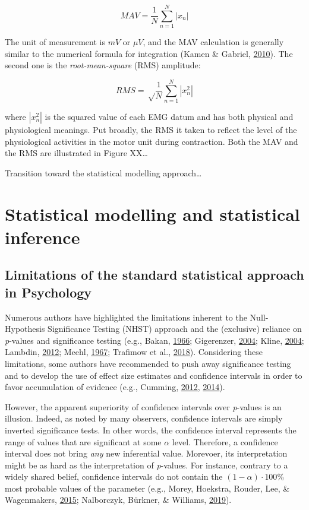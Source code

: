 \documentclass[a4paper,12pt,twoside,openright,oldfontcommands]{memoir}
\begin{document}
\[MAV = \frac{1}{N} \sum_{n=1}^{N} | x_{n} |\]

The unit of measurement is \(mV\) or \(\mu V\), and the MAV calculation
is generally similar to the numerical formula for integration (Kamen \&
Gabriel, \protect\hyperlink{ref-kamen_essentials_2010}{2010}). The
second one is the \emph{root-mean-square} (RMS) amplitude:

\[RMS = \sqrt \frac{1}{N} \sum_{n=1}^{N} | x^{2}_{n} |\]

where \(| x^{2}_{n} |\) is the squared value of each EMG datum and has
both physical and physiological meanings. Put broadly, the RMS it taken
to reflect the level of the physiological activities in the motor unit
during contraction. Both the MAV and the RMS are illustrated in Figure
XX\ldots{}

Transition toward the statistical modelling approach\ldots{}

\section{Statistical modelling and statistical
inference}\label{statistical-modelling-and-statistical-inference}

\subsection{Limitations of the standard statistical approach in
Psychology}\label{limitations-of-the-standard-statistical-approach-in-psychology}

Numerous authors have highlighted the limitations inherent to the
Null-Hypothesis Significance Testing (NHST) approach and the (exclusive)
reliance on \emph{p}-values and significance testing (e.g., Bakan,
\protect\hyperlink{ref-bakan_test_1966}{1966}; Gigerenzer,
\protect\hyperlink{ref-Gigerenzer2004}{2004}; Kline,
\protect\hyperlink{ref-Kline2004}{2004}; Lambdin,
\protect\hyperlink{ref-Lambdin2012}{2012}; Meehl,
\protect\hyperlink{ref-meehl_theory-testing_1967}{1967}; Trafimow et
al., \protect\hyperlink{ref-trafimow_manipulating_2018}{2018}).
Considering these limitations, some authors have recommended to push
away significance testing and to develop the use of effect size
estimates and confidence intervals in order to favor accumulation of
evidence (e.g., Cumming, \protect\hyperlink{ref-Cumming2012}{2012},
\protect\hyperlink{ref-cumming_new_2014}{2014}).

However, the apparent superiority of confidence intervals over
\emph{p}-values is an illusion. Indeed, as noted by many observers,
confidence intervals are simply inverted significance tests. In other
words, the confidence interval represents the range of values that are
significant at some \(\alpha\) level. Therefore, a confidence interval
does not bring \emph{any} new inferential value. Morevoer, its
interpretation might be as hard as the interpretation of
\emph{p}-values. For instance, contrary to a widely shared belief,
confidence intervals do not contain the \((1 - \alpha) \cdot 100\)\%
most probable values of the parameter (e.g., Morey, Hoekstra, Rouder,
Lee, \& Wagenmakers, \protect\hyperlink{ref-morey_fallacy_2015}{2015};
Nalborczyk, Bürkner, \& Williams,
\protect\hyperlink{ref-nalborczyk_pragmatism_2019}{2019}).
\end{document}
